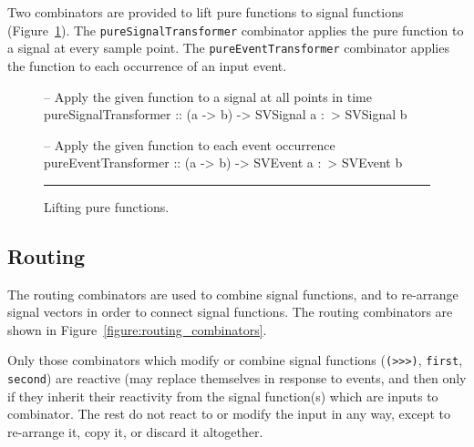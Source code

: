 Two combinators are provided to lift pure functions to signal functions
(Figure~\ref{figure:lifting_pure_functions}). The {\tt pureSignalTransformer}
combinator applies the pure function to a signal at every sample point. The
{\tt pureEventTransformer} combinator applies the function to each occurrence of
an input event.

\begin{figure}
\begin{code}
-- Apply the given function to a signal at all points in time
pureSignalTransformer :: (a -> b) -> SVSignal a :~> SVSignal b

-- Apply the given function to each event occurrence
pureEventTransformer  :: (a -> b) -> SVEvent a :~> SVEvent b
\end{code}
\hrule
\caption{Lifting pure functions.}
\label{figure:lifting_pure_functions}
\end{figure}

\subsection{Routing}
\label{subsection:System_Design_and_Interface-Combinators-Routing}

The routing combinators are used to combine signal functions, and
to re-arrange signal vectors in order to connect signal functions.
The routing combinators are shown in Figure~\ref{figure:routing_combinators}.

Only those combinators which modify or combine signal functions
({\tt (>>>)}, {\tt first}, {\tt second}) are reactive (may replace themselves in
response to events, and then only if they inherit their reactivity from the
signal function(s) which are inputs to combinator. The rest do not
react to or modify the input in any way, except to re-arrange it, copy it, or
discard it altogether.

